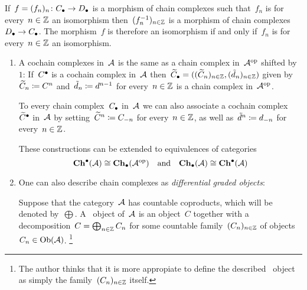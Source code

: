\begin{remark*}
  If~$f = (f_n)_n \colon C_\bullet \to D_\bullet$ is a morphism of chain complexes such that~$f_n$ is for every~$n \in \mathbb{Z}$ an isomorphism then~$(f_n^{-1})_{n \in \mathbb{Z}}$ is a morphism of chain complexes~$D_\bullet \to C_\bullet$.
  The morphism~$f$ is therefore an isomorphism if and only if~$f_n$ is for every~$n \in \mathbb{Z}$ an isomorphism.
\end{remark*}


\begin{remark}
  \leavevmode
  \begin{enumerate}
    \item
      A cochain complexes in~$\mathcal{A}$ is the same as a chain complex in~$\mathcal{A}^{\mathrm{op}}$ shifted by~$1$:
      If~$C^\bullet$ is a cochain complex in~$\mathcal{A}$ then~$\widetilde{C}_\bullet = ( (\widetilde{C}_n)_{n \in \mathbb{Z}}, (\tilde{d}_n)_{n \in \mathbb{Z}} )$ given by~$\widetilde{C}_n \coloneqq C^n$ and~$\tilde{d}_n \coloneqq d^{n-1}$ for every~$n \in \mathbb{Z}$ is a chain complex in~$\mathcal{A}^{\mathrm{op}}$.
      
      To every chain complex~$C_\bullet$ in~$\mathcal{A}$ we can also associate a cochain complex~$\widetilde{C}^\bullet$ in~$\mathcal{A}$ by setting~$\widetilde{C}^n \coloneqq C_{-n}$ for every~$n \in \mathbb{Z}$, as well as~$\tilde{d}^n \coloneqq d_{-n}$ for every~$n \in \mathbb{Z}$.
      
      These constructions can be extended to equivalences of categories
      \[
              \mathbf{Ch}^\bullet(\mathcal{A})
        \cong \mathbf{Ch}_\bullet(\mathcal{A}^{\mathrm{op}})
        \quad\text{and}\quad
              \mathbf{Ch}_\bullet(\mathcal{A})
        \cong \mathbf{Ch}^\bullet(\mathcal{A})
      \]
    \item
      One can also describe chain complexes as \emph{differential graded objects}:
      
      Suppose that the category~$\mathcal{A}$ has countable coproducts, which will be denoted by~$\bigoplus$.
      A~ object of~$\mathcal{A}$ is an object~$C$ together with a decomposition~$C = \bigoplus_{n \in \mathbb{Z}} C_n$ for some countable family~$(C_n)_{n \in \mathbb{Z}}$ of objects~$C_n \in \operatorname{Ob}(\mathcal{A})$.%
      \footnote{The author thinks that it is more appropiate to define the described~ object as simply the family~$(C_n)_{n \in \mathbb{Z}}$ itself.}
      

\end{enumerate}
\end{remark}
